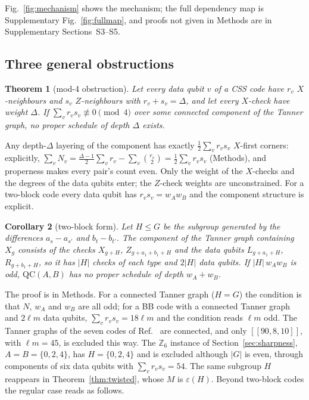 \documentclass[reprint,twocolumn,superscriptaddress,nofootinbib]{revtex4-2}
\theoremstyle{plain}
\newtheorem{theorem}{Theorem}
\newtheorem{corollary}[theorem]{Corollary}
\newcommand{\wA}{w_A}                  %
\newcommand{\wB}{w_B}
\begin{document}
Fig.~\ref{fig:mechanism} shows the mechanism; the full dependency map is
Supplementary Fig.~\ref{fig:fullmap}, and proofs not given in Methods are
in Supplementary Sections~S3--S5.

\subsection{Three general obstructions}

\begin{theorem}[mod-4 obstruction]
\label{thm:mod4}
Let every data qubit $v$ of a CSS code have $r_v$ $X$-neighbours and $s_v$
$Z$-neighbours with $r_v+s_v=\Delta$, and let every $X$-check have weight
$\Delta$. If $\sum_v r_vs_v\not\equiv0\pmod 4$ over some connected
component of the Tanner graph, no proper schedule of depth $\Delta$
exists.
\end{theorem}

Any depth-$\Delta$ layering of the component has exactly
$\frac12\sum_vr_vs_v$ $X$-first corners: explicitly,
$\sum_vN_v=\tfrac{\Delta-1}{2}\sum_vr_v-\sum_v\binom{r_v}{2}
=\tfrac12\sum_vr_vs_v$ (Methods), and properness makes every pair's count
even. Only the weight of the $X$-checks and the degrees of the data qubits
enter; the $Z$-check weights are unconstrained. For a two-block code every
data qubit has $r_vs_v=\wA\wB$ and the component structure is explicit.

\begin{corollary}[two-block form]
\label{cor:twoblock}
Let $H\le G$ be the subgroup generated by the differences $a_s-a_{s'}$ and
$b_t-b_{t'}$. The component of the Tanner graph containing $X_g$ consists of
the checks $X_{g+H}$, $Z_{g+a_1+b_1+H}$ and the data qubits $L_{g+a_1+H}$,
$R_{g+b_1+H}$, so it has $|H|$ checks of each type and $2|H|$ data qubits.
If $|H|\,\wA\wB$ is odd, $\mathrm{QC}(A,B)$ has no proper schedule of depth
$\wA+\wB$.
\end{corollary}

The proof is in Methods. For a connected Tanner graph ($H=G$) the condition
is that $N$, $\wA$ and $\wB$ are all odd; for a BB code with a connected
Tanner graph and $2\ell m$ data qubits, $\sum_vr_vs_v=18\ell m$ and the
condition reads $\ell m$ odd. The Tanner graphs of the seven codes of
Ref.~\cite{Bravyi2024} are connected, and only $[[90,8,10]]$, with
$\ell m=45$, is excluded this way. The $\mathbb{Z}_6$ instance of
Section~\ref{sec:sharpness}, $A=B=\{0,2,4\}$, has $H=\{0,2,4\}$ and is
excluded although $|G|$ is even, through components of six data qubits
with $\sum_vr_vs_v=54$. The same subgroup $H$ reappears in
Theorem~\ref{thm:twisted}, whose $M$ is $\varepsilon(H)$. Beyond two-block
codes the regular case reads as follows.
\end{document}
